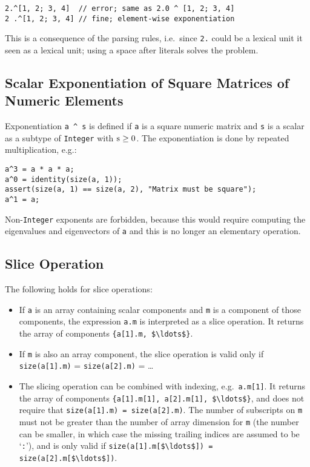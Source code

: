 \begin{example}
\begin{lstlisting}[language=modelica]
2.^[1, 2; 3, 4]  // error; same as 2.0 ^ [1, 2; 3, 4]
2 .^[1, 2; 3, 4] // fine; element-wise exponentiation
\end{lstlisting}
This is a consequence of the parsing rules, i.e.\ since \lstinline!2.! could be a lexical unit it seen as a lexical unit; using a space after
literals solves the problem.
\end{example}

\subsection{Scalar Exponentiation of Square Matrices of Numeric Elements}

Exponentiation \lstinline!a ^ s! is defined if \lstinline!a! is a square numeric matrix and \lstinline!s! is a scalar as a subtype of \lstinline!Integer!
with $\text{\lstinline!s!} \geq 0$.  The exponentiation is done by repeated multiplication, e.g.:
\begin{lstlisting}[language=modelica]
a^3 = a * a * a;
a^0 = identity(size(a, 1));
assert(size(a, 1) == size(a, 2), "Matrix must be square");
a^1 = a;
\end{lstlisting}

\begin{nonnormative}
Non-\lstinline!Integer! exponents are forbidden, because this would require
computing the eigenvalues and eigenvectors of \lstinline!a! and this is no
longer an elementary operation.
\end{nonnormative}

\subsection{Slice Operation}

The following holds for slice operations:
\begin{itemize}
\item
  If \lstinline!a! is an array containing scalar components and \lstinline!m! is a component of those components, the expression \lstinline!a.m! is interpreted as a
  slice operation.  It returns the array of components \lstinline!{a[1].m, $\ldots$}!.
\item
  If \lstinline!m! is also an array component, the slice operation is valid only if \lstinline!size(a[1].m)! = \lstinline!size(a[2].m)! = \ldots
\item
  The slicing operation can be combined with indexing, e.g.\ \lstinline!a.m[1]!.  It returns the array of components \lstinline!{a[1].m[1], a[2].m[1], $\ldots$}!,
  and does not require that \lstinline!size(a[1].m) = size(a[2].m)!.  The number of subscripts on \lstinline!m! must not be greater than the number of array dimension
  for \lstinline!m! (the number can be smaller, in which case the missing trailing indices are assumed to be `\lstinline!:!'), and is only valid if
  \lstinline!size(a[1].m[$\ldots$]) = size(a[2].m[$\ldots$])!.
\end{itemize}

